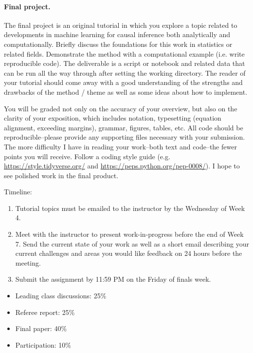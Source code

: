 \documentclass[letterpaper, 12pt, parskip=full,DIV=10]{scrartcl}
\begin{document}
\paragraph{Final project.}
The final project is an original tutorial in which you explore a topic related to developments in machine learning for causal inference both analytically and computationally. 
Briefly discuss the foundations for this work in statistics or related fields. 
Demonstrate the method with a computational example (i.e. write reproducible code). 
The deliverable is a script or notebook and related data that can be run all the way through after setting the working directory. 
The reader of your tutorial should come away with a good understanding of the strengths and drawbacks of the method / theme as well as some ideas about how to implement.

You will be graded not only on the accuracy of your overview, but also on the clarity of your exposition, which includes notation, typesetting (equation alignment, exceeding margins), grammar, figures, tables, etc. 
All code should be reproducible--please provide any supporting files necessary with your submission. 
The more difficulty I have in reading your work--both text and code--the fewer points you will receive. 
Follow a coding style guide  (e.g. \url{https://style.tidyverse.org/} and \url{https://peps.python.org/pep-0008/}). 
I hope to see polished work in the final product.

Timeline:
\begin{enumerate}
\item Tutorial topics must be emailed to the instructor by the Wednesday of Week 4.  
\item Meet with the instructor to present work-in-progress before the end of Week 7. Send the current state of your work as well as a short email describing your current challenges and areas you would like feedback on 24 hours before the meeting. 
\item Submit the assignment by 11:59 PM on the Friday of finals week.
\end{enumerate}

\begin{itemize}[topsep=0pt,itemsep=-1ex,partopsep=1ex,parsep=1ex]
\item Leading class discussions: 25\% 
\item Referee report: 25\%
\item Final paper: 40\%
\item Participation: 10\%
\end{itemize}
\end{document}
